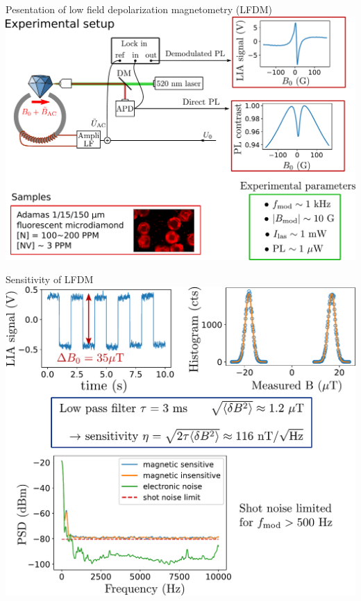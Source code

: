\documentclass{beamer}
\begin{document}
\begin{frame}{Pesentation of low field depolarization magnetometry (LFDM)}
\centering
\includegraphics[width=\textwidth,height=0.9\textheight,keepaspectratio]{Slide_principle_LFDM}
\end{frame}

\begin{frame}{Sensitivity of LFDM}
\centering
\includegraphics[width=\textwidth,height=0.9\textheight,keepaspectratio]{Slide_sensi_LFDM}
\end{frame}
\end{document}
